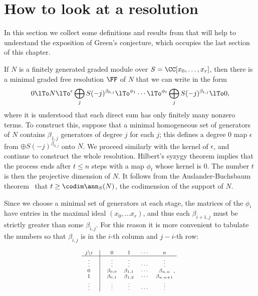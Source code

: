\section{How to look at a resolution}
In this section we collect some definitions and results from \cite{Eisenbud1995} that will help to understand the exposition of Green's conjecture, which occupies the last section of this chapter.

If $N$ is a finitely generated graded module over $S = \CC[x_0,\dots, x_r]$, then there is a minimal graded free resolution $\FF$
of $N$ that we can write in the form
$$
0\lTo N \lTo^\epsilon \bigoplus_jS(-j)^{\beta_{0,j}} \lTo^{\phi_1} \cdots \lTo^{\phi_t}\bigoplus_jS(-j)^{\beta_{t,j}}\lTo 0,
$$
where it is understood that each direct sum has only finitely many nonzero terms.
To construct this, suppose that a minimal homogeneous set of generators of $N$
contains $\beta_{1,j}$ generators of degree $j$ for each $j$; this defines a degree 0 map $\epsilon$
from 
$
\oplus S(-j)^{\beta_{0,j}}
$
onto $N$. We proceed similarly with the kernel of $\epsilon$, and continue to construct the whole resolution.
Hilbert's syzygy theorem \cite[***]{Eisenbud1995} implies that the process ends after $t\leq n$ steps with a map $\phi_t$ whose
kernel is 0. The number $t$ is then the projective dimension of $N$. It follows from the Auslander-Buchsbaum
theorem~\cite[***]{Eisenbud1995} that $t \geq \codim \ann_S(N)$, the codimension of the support of $N$.

Since we choose a minimal set of generators at each stage, the matrices of the $\phi_i$ have entries in the maximal
ideal $(x_0,\dots x_r)$, and thus each $\beta_{i+1, j}$ must be strictly greater than some $\beta_{i,j}$. For this reason it
is more convenient to tabulate the numbers so that $\beta_{i,j}$ is in the $i$-th column and $j-i$-th row:

$$
\scriptsize{
\begin{matrix} 
j\backslash i&\vline&0   &  1    & \cdots & n    \cr\hline
\vdots&\vline&\vdots&\vdots & \cdots    &\vdots     \cr 
       0&\vline&\beta_{0,0}&\beta_{1,1}&\cdots&\beta_{n,n}\cr
       1&\vline&\beta_{0,1}&\beta_{1,2}&\cdots&\beta_{n,n+1}\cr
\vdots&\vline&\vdots&\vdots & \cdots    &\vdots     \cr 
\end{matrix}.
}
$$         


